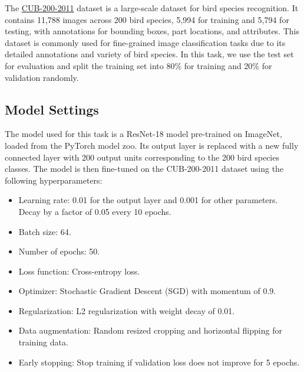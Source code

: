 \documentclass[UTF8]{ctexart}
\begin{document}
The \href{https://data.caltech.edu/records/65de6-vp158}{CUB-200-2011} dataset is a large-scale dataset for bird species recognition. It contains 11,788 images across 200 bird species, 5,994 for training and 5,794 for testing, 
with annotations for bounding boxes, part locations, and attributes. 
This dataset is commonly used for fine-grained image classification tasks due to its detailed annotations and variety of bird species.
In this task, we use the test set for evaluation and split the training set into 80\% for training and 20\% for validation randomly.

\subsection{Model Settings}
The model used for this task is a ResNet-18 model pre-trained on ImageNet, loaded from the PyTorch model zoo.
Its output layer is replaced with a new fully connected layer with 200 output units corresponding to the 200 bird species classes.
The model is then fine-tuned on the CUB-200-2011 dataset using the following hyperparameters:
\begin{itemize}
    \item Learning rate: 0.01 for the output layer and 0.001 for other parameters. Decay by a factor of 0.05 every 10 epochs.
    \item Batch size: 64.
    \item Number of epochs: 50.
    \item Loss function: Cross-entropy loss.
    \item Optimizer: Stochastic Gradient Descent (SGD) with momentum of 0.9.
    \item Regularization: L2 regularization with weight decay of 0.01.
    \item Data augmentation: Random resized cropping and horizontal flipping for training data.
    \item Early stopping: Stop training if validation loss does not improve for 5 epochs.
\end{itemize}
\end{document}
